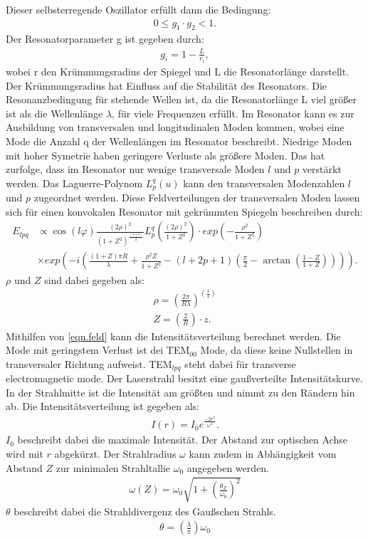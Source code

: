 Dieser selbsterregende Oszillator erfüllt dann die Bedingung:
\begin{align*}
  0\leq g_1\cdot g_2 <1.
\end{align*}
Der Resonatorparameter g ist gegeben durch:
\begin{align*}
  g_i=1-\frac{L}{r_i},
\end{align*}
wobei r den Krümmungsradius der Spiegel und L die Resonatorlänge darstellt.
Der Krümmungsradius hat Einfluss auf die Stabilität des Resonators.
%
Die Resonanzbedingung für stehende Wellen ist, da die Resonatorlänge L viel größer ist als die Wellenlänge $\lambda$, für viele Frequenzen erfüllt.
Im Resonator kann es zur Ausbildung von transversalen und longitudinalen Moden kommen, wobei eine Mode die Anzahl q der Wellenlängen im Resonator beschreibt.
Niedrige Moden mit hoher Symetrie haben geringere Verluste als größere Moden.
Das hat zurfolge, dass im Resonator nur wenige transversale Moden $l$ und $p$ verstärkt werden.
Das Laguerre-Polynom $L_p^q(u)$ kann den transversalen Modenzahlen $l$ und $p$ zugeordnet werden.
Diese Feldverteilungen der transversalen Moden lassen sich für einen konvokalen Resonator mit gekrümmten Spiegeln beschreiben durch:
%
\begin{align}
  E_{lpq} &\propto \cos(l \varphi)\frac{(2\rho)^2}{(1+Z^2)^{\frac{(1+l)}{2}}}
  L_p^q\left(\frac{(2\rho)^2}{1+Z^2}\right)\cdot exp \left(-\frac{\rho^2}{1+Z^2}\right)\\
  &\times exp \left(-i\left(\frac{(1+Z)\pi R}{\lambda}+\frac{\rho^2Z}{1+Z^2}-(l+2p+1)\left(\frac{\pi}{2}-
  \arctan\left(\frac{1-Z}{1+Z}\right)\right)\right)\right).
\label{eqn.feld}
\end{align}
$\rho$ und $Z$ sind dabei gegeben als:
\begin{align*}
  \rho=\left(\frac{2\pi}{R\lambda}\right)^{(\frac{1}{2})}\\
  Z=\left(\frac{2}{R}\right)\cdot z.
\end{align*}
Mithilfen von \ref{eqn.feld} kann die Intensitätsverteilung berechnet werden.
Die Mode mit geringstem Verlust ist dei TEM$_{00}$ Mode, da diese keine Nullstellen in transversaler Richtung aufweist.
TEM$_{lpq}$ steht dabei für transverse electromagnetic mode.
Der Laserstrahl besitzt eine gaußverteilte Intensitätskurve.
In der Strahlmitte ist die Intensität am größten und nimmt zu den Rändern hin ab.
Die Intensitätsverteilung ist gegeben als:
\begin{align*}
  I(r)=I_0e^{\frac{-2r^2}{\omega ^2}}.
\end{align*}
$I_0$ beschreibt dabei die maximale Intensität.
Der Abstand zur optischen Achse wird mit $r$ abgekürzt.
Der Strahlradius $\omega$ kann zudem in Abhängigkeit vom Abstand $Z$ zur minimalen Strahltallie $\omega_0$ angegeben werden.
\begin{align*}
  \omega(Z)=\omega_0\sqrt{1+\left(\frac{\theta_Z}{\omega_0}\right)^2}
\end{align*}
$\theta$ beschreibt dabei die Strahldivergenz des Gaußschen Strahls.
\begin{align*}
  \theta=\left(\frac{\lambda}{\pi}\right)\omega_0
\end{align*}
